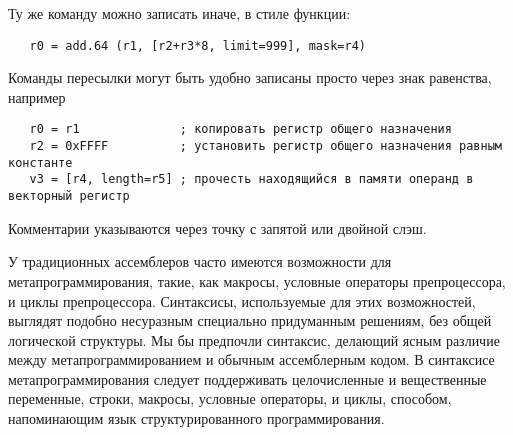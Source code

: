 \documentclass[forwardcom.tex]{subfiles}
\begin{document}
Ту же команду можно записать иначе, в стиле функции: 
\begin{verbatim}
   r0 = add.64 (r1, [r2+r3*8, limit=999], mask=r4)
\end{verbatim}

Команды пересылки могут быть удобно записаны просто через знак равенства, например
\begin{verbatim}
   r0 = r1              ; копировать регистр общего назначения
   r2 = 0xFFFF          ; установить регистр общего назначения равным константе
   v3 = [r4, length=r5] ; прочесть находящийся в памяти операнд в векторный регистр
\end{verbatim}

Комментарии указываются через точку с запятой или двойной слэш.

У традиционных ассемблеров часто имеются возможности для метапрограммирования, такие, как макросы, условные операторы препроцессора, и циклы препроцессора. Синтаксисы, используемые для этих возможностей, выглядят подобно несуразным специально придуманным решениям, без общей логической структуры. Мы бы предпочли синтаксис, делающий ясным различие между метапрограммированием и обычным ассемблерным кодом. В синтаксисе метапрограммирования следует поддерживать целочисленные и вещественные переменные, строки, макросы, условные операторы, и циклы, способом, напоминающим язык структурированного программирования.
\end{document}
